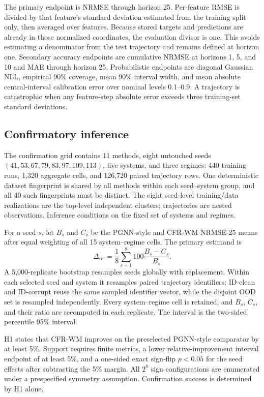 \documentclass[iicol,pdflatex,sn-basic,Numbered]{sn-jnl}
\newcommand{\method}{CFR-WM}
\begin{document}
The primary endpoint is NRMSE through horizon 25. Per-feature RMSE is divided
by that feature's standard deviation estimated from the training split only,
then averaged over features. Because stored targets and predictions are already
in those normalized coordinates, the evaluation divisor is one. This avoids
estimating a denominator from the test trajectory and remains defined at
horizon one. Secondary accuracy endpoints are cumulative NRMSE at horizons 1,
5, and 10 and MAE through horizon 25. Probabilistic endpoints are diagonal
Gaussian NLL, empirical 90\% coverage, mean 90\% interval width, and mean
absolute central-interval calibration error over nominal levels 0.1--0.9. A
trajectory is catastrophic when any feature-step absolute error exceeds three
training-set standard deviations.

\subsection{Confirmatory inference}

The confirmation grid contains 11 methods, eight untouched seeds
$(41,53,67,79,83,97,109,113)$, five systems, and three regimes: 440 training
runs, 1,320 aggregate cells, and 126,720 paired trajectory rows. One
deterministic dataset fingerprint is shared by all methods within each
seed--system group, and all 40 such fingerprints must be distinct. The eight
seed-level training/data realizations are the top-level independent clusters;
trajectories are nested observations. Inference conditions on the fixed set of
systems and regimes.

For a seed $s$, let $B_s$ and $C_s$ be the PGNN-style and CFR-WM NRMSE-25 means after
equal weighting of all 15 system--regime cells. The primary estimand is
\begin{equation}
 \Delta_{\mathrm{rel}}=\frac{1}{8}\sum_{s=1}^{8}
 100\frac{B_s-C_s}{B_s}.
 \label{eq:primary-estimand}
\end{equation}
A 5,000-replicate bootstrap resamples seeds globally with replacement. Within
each selected seed and system it resamples paired trajectory identifiers;
ID-clean and ID-corrupt reuse the same sampled identifier vector, while the
disjoint OOD set is resampled independently. Every system--regime cell is
retained, and $B_s$, $C_s$, and their ratio are recomputed in each replicate.
The interval is the two-sided percentile 95\% interval.

H1 states that \method{} improves on the preselected PGNN-style comparator by at least 5\%.
Support requires finite metrics, a lower relative-improvement interval endpoint
of at least 5\%, and a one-sided exact sign-flip $p<0.05$ for the seed effects
after subtracting the 5\% margin. All $2^8$ sign configurations are enumerated
under a prespecified symmetry assumption. Confirmation success is determined
by H1 alone.
\end{document}
